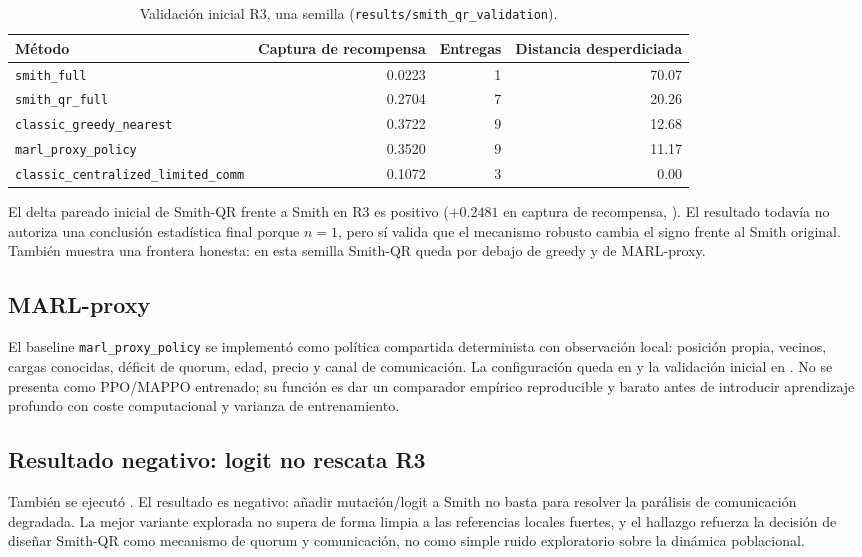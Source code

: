 \begin{table}[H]
\centering
\caption{Validación inicial R3, una semilla (\texttt{results/smith\_qr\_validation}).}
\label{tab:smith-qr-r3}
\begin{tabular}{@{}lrrr@{}}
\toprule
Método & Captura de recompensa & Entregas & Distancia desperdiciada \\
\midrule
\texttt{smith\_full} & 0.0223 & 1 & 70.07 \\
\texttt{smith\_qr\_full} & 0.2704 & 7 & 20.26 \\
\texttt{classic\_greedy\_nearest} & 0.3722 & 9 & 12.68 \\
\texttt{marl\_proxy\_policy} & 0.3520 & 9 & 11.17 \\
\texttt{classic\_centralized\_limited\_comm} & 0.1072 & 3 & 0.00 \\
\bottomrule
\end{tabular}
\end{table}

El delta pareado inicial de Smith-QR frente a Smith en R3 es positivo
($+0.2481$ en captura de recompensa, ). El resultado todavía no
autoriza una conclusión estadística final porque $n=1$, pero sí valida que el mecanismo
robusto cambia el signo frente al Smith original. También muestra una frontera honesta:
en esta semilla Smith-QR queda por debajo de greedy y de MARL-proxy.

\subsection{MARL-proxy}

El baseline \texttt{marl\_proxy\_policy} se implementó como política compartida
determinista con observación local: posición propia, vecinos, cargas conocidas, déficit
de quorum, edad, precio y canal de comunicación. La configuración queda en
 y la validación inicial en
. No se presenta como PPO/MAPPO entrenado; su función es
dar un comparador empírico reproducible y barato antes de introducir aprendizaje
profundo con coste computacional y varianza de entrenamiento.

\subsection{Resultado negativo: logit no rescata R3}

También se ejecutó . El resultado es negativo:
añadir mutación/logit a Smith no basta para resolver la parálisis de comunicación
degradada. La mejor variante explorada no supera de forma limpia a las referencias
locales fuertes, y el hallazgo refuerza la decisión de diseñar Smith-QR como mecanismo
de quorum y comunicación, no como simple ruido exploratorio sobre la dinámica
poblacional.

